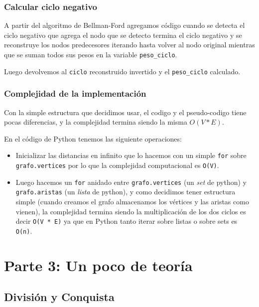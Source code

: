 \documentclass[titlepage,a4paper]{article}
\begin{document}
\subsubsection{Calcular ciclo negativo}
\label{sec:orge8df4d6}

A partir del algoritmo de Bellman-Ford agregamos código cuando se detecta el
ciclo negativo que agrega el nodo que se detecto termina el ciclo negativo y se
reconstruye los nodos predecesores iterando hasta volver al nodo original
mientras que se suman todos sus pesos en la variable \texttt{peso\_ciclo}.

Luego devolvemos al \texttt{ciclo} reconstruido invertido y el \texttt{peso\_ciclo} calculado.

\subsubsection{Complejidad de la implementación}
\label{sec:org61654f6}

Con la simple estructura que decidimos usar, el codigo y el pseudo-codigo tiene
pocas diferencias, y la complejidad termina siendo la misma \(O(V * E)\).

En el código de Python tenemos las siguiente operaciones:
\begin{itemize}
\item Inicializar las distancias en infinito que lo hacemos con un simple \texttt{for}
sobre \texttt{grafo.vertices} por lo que la complejidad computacional es \texttt{O(V)}.
\item Luego hacemos un \texttt{for} anidado entre \texttt{grafo.vertices} (un \emph{set} de python) y
\texttt{grafo.aristas} (un \emph{lista} de python), y como decidimos tener estructura
simple (cuando creamos el grafo almacenamos los vértices y las aristas como
vienen), la complejidad termina siendo la multiplicación de los dos ciclos es
decir \texttt{O(V * E)} ya que en Python tanto iterar sobre listas o sobre sets es
\texttt{O(n)}.
\end{itemize}

\newpage

\section{Parte 3: Un poco de teoría}
\label{sec:org3db64ec}

\subsection{División y Conquista}
\label{sec:org5b1a70c}
\end{document}
